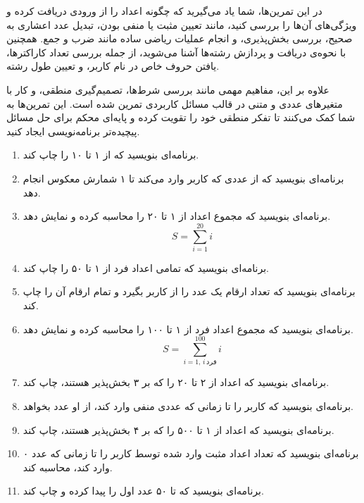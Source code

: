 \documentclass[b5paper,12pt]{article}
\begin{document}
	در این تمرین‌ها، شما یاد می‌گیرید که چگونه اعداد را از ورودی دریافت کرده و ویژگی‌های آن‌ها را بررسی کنید، مانند تعیین مثبت یا منفی بودن، تبدیل عدد اعشاری به صحیح، بررسی بخش‌پذیری، و انجام عملیات ریاضی ساده مانند ضرب و جمع. همچنین با نحوه‌ی دریافت و پردازش رشته‌ها آشنا می‌شوید، از جمله بررسی تعداد کاراکترها، یافتن حروف خاص در نام کاربر، و تعیین طول رشته.

	علاوه بر این، مفاهیم مهمی مانند بررسی شرط‌ها، تصمیم‌گیری منطقی، و کار با متغیرهای عددی و متنی در قالب مسائل کاربردی تمرین شده است. این تمرین‌ها به شما کمک می‌کنند تا تفکر منطقی خود را تقویت کرده و پایه‌ای محکم برای حل مسائل پیچیده‌تر برنامه‌نویسی ایجاد کنید.

	\begin{enumerate}
		\item برنامه‌ای بنویسید که از ۱ تا ۱۰ را چاپ کند.
		
		\item برنامه‌ای بنویسید که از عددی که کاربر وارد می‌کند تا ۱ شمارش معکوس انجام دهد.
		
		\item برنامه‌ای بنویسید که مجموع اعداد از ۱ تا ۲۰ را محاسبه کرده و نمایش دهد.
		\[
		S = \sum_{i=1}^{20} i
		\]
		
		\item برنامه‌ای بنویسید که تمامی اعداد فرد از ۱ تا ۵۰ را چاپ کند.
		
		\item برنامه‌ای بنویسید که تعداد ارقام یک عدد را از کاربر بگیرد و تمام ارقام آن را چاپ کند.
		
		\item برنامه‌ای بنویسید که مجموع اعداد فرد از ۱ تا ۱۰۰ را محاسبه کرده و نمایش دهد.
		\[
		S = \sum_{i=1, \, i \, \text{فرد}}^{100} i
		\]
		
		\item برنامه‌ای بنویسید که اعداد از ۲ تا ۲۰ را که بر ۳ بخش‌پذیر هستند، چاپ کند.
		
		\item برنامه‌ای بنویسید که کاربر را تا زمانی که عددی منفی وارد کند، از او عدد بخواهد.
		
		\item برنامه‌ای بنویسید که اعداد از ۱ تا ۵۰۰ را که بر ۴ بخش‌پذیر هستند، چاپ کند.
		
		\item برنامه‌ای بنویسید که تعداد اعداد مثبت وارد شده توسط کاربر را تا زمانی که عدد ۰ وارد کند، محاسبه کند.
		
		\item برنامه‌ای بنویسید که تا ۵۰ عدد اول را پیدا کرده و چاپ کند.
		

\end{enumerate}
\end{document}
